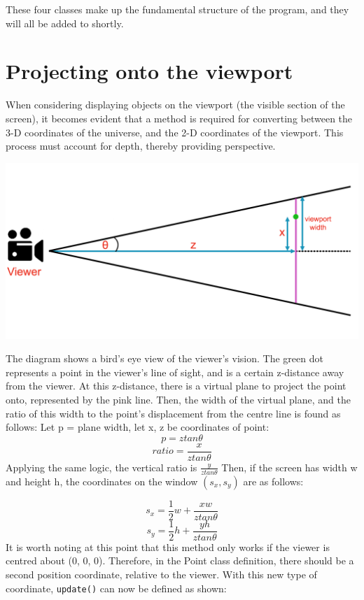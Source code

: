 \documentclass{article}
\begin{document}
These four classes make up the fundamental structure of the program, and they will all be added to shortly.

\newpage
\section{Projecting onto the viewport}
When considering displaying objects on the viewport (the visible section of the screen), it becomes evident that a method is required for converting between the 3-D coordinates of the universe, and the 2-D coordinates of the viewport. This process must account for depth, thereby providing perspective.

\includegraphics[width=1\textwidth]{projection_diagram.png}

The diagram shows a bird's eye view of the viewer's vision. The green dot represents a point in the viewer's line of sight, and is a certain z-distance away from the viewer. At this z-distance, there is a virtual plane to project the point onto, represented by the pink line. 
\newline
\newline
Then, the width of the virtual plane, and the ratio of this width to the point's displacement from the centre line is found as follows:
\newline
\newline
Let p = plane width, let x, z be coordinates of point:
$$ p = ztan{\theta} $$
$$ ratio = \frac{x}{ztan{\theta}} $$
Applying the same logic, the vertical ratio is $ \frac{y}{ztan{\theta}} $
\newline
\newline
Then, if the screen has width w and height h, the coordinates on the window $(s_x, s_y) $ are as follows:

$$ s_x = \frac{1}{2}w + \frac{xw}{ztan{\theta}} $$
$$ s_y = \frac{1}{2}h + \frac{yh}{ztan{\theta}} $$
\newpage
It is worth noting at this point that this method only works if the viewer is centred about (0, 0, 0). Therefore, in the Point class definition, there should be a second position coordinate, relative to the viewer. With this new type of coordinate, \verb|update()| can now be defined as shown:
\end{document}
